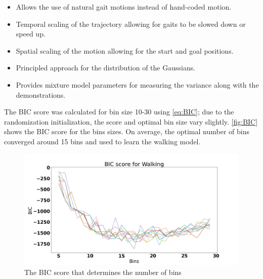 \begin{itemize}
    \item Allows the use of natural gait motions instead of hand-coded motion.
    \item Temporal scaling of the trajectory allowing for gaits to be slowed down or speed up.
    \item Spatial scaling of the motion allowing for the start and goal positions.
    \item Principled approach for the distribution of the Gaussians.
    \item Provides mixture model parameters for measuring the variance along with the demonstrations.
\end{itemize}


The BIC score was calculated for bin size 10-30 using  \autoref{eq:BIC}; due to the randomization initialization, the score and optimal bin size vary slightly. \autoref{fig:BIC} shows the BIC score for the bins sizes. On average, the optimal number of bins converged around 15 bins and used to learn the walking model.    

\begin{figure}
    \centering
    \includegraphics[scale=0.3]{images/gait_data/BIC_Walk.png}
    \caption[BIC score for walking]{The BIC score that determines the number of bins}
    \label{fig:BIC}
\end{figure}

